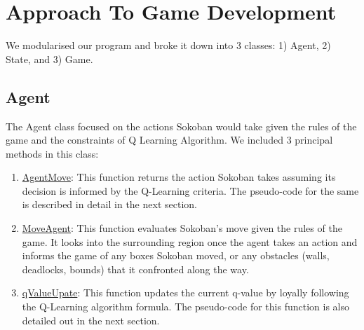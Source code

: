\documentclass{article}
\begin{document}

\section{Approach To Game Development}

We modularised our program and broke it down into 3 classes: 1) Agent, 2) State, and 3) Game.

\subsection{Agent}
The Agent class focused on the actions Sokoban would take given the rules of the game and the constraints of Q Learning Algorithm. We included 3 principal methods in this class:
    
\begin{enumerate}[label=\alph*)]
    \item \underline{AgentMove}: This function returns the action Sokoban takes assuming its decision is informed by the Q-Learning criteria. The pseudo-code for the same is described in detail in the next section.
    \item \underline{MoveAgent}: This function evaluates Sokoban's move given the rules of the game. It looks into the surrounding region once the agent takes an action and informs the game of any boxes Sokoban moved, or any obstacles (walls, deadlocks, bounds) that it confronted along the way. 
    \item \underline{qValueUpate}: This function updates the current q-value by loyally following the Q-Learning algorithm formula. The pseudo-code for this function is also detailed out in the next section. 
\end{enumerate}
\end{document}

